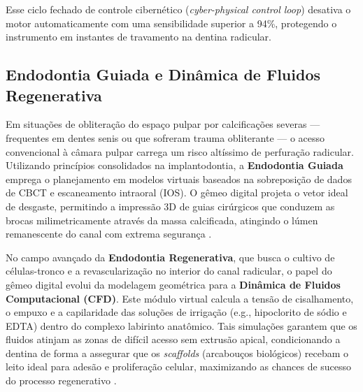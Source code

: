 Esse ciclo fechado de controle cibernético (\textit{cyber-physical control loop}) desativa o motor automaticamente com uma sensibilidade superior a 94\%, protegendo o instrumento em instantes de travamento na dentina radicular. 

\subsection{Endodontia Guiada e Dinâmica de Fluidos Regenerativa}

Em situações de obliteração do espaço pulpar por calcificações severas --- frequentes em dentes senis ou que sofreram trauma obliterante --- o acesso convencional à câmara pulpar carrega um risco altíssimo de perfuração radicular. Utilizando princípios consolidados na implantodontia, a \textbf{Endodontia Guiada} emprega o planejamento em modelos virtuais baseados na sobreposição de dados de CBCT e escaneamento intraoral (IOS). O gêmeo digital projeta o vetor ideal de desgaste, permitindo a impressão 3D de guias cirúrgicos que conduzem as brocas milimetricamente através da massa calcificada, atingindo o lúmen remanescente do canal com extrema segurança \cite{khoshfekr2025review}.


No campo avançado da \textbf{Endodontia Regenerativa}, que busca o cultivo de células-tronco e a revascularização no interior do canal radicular, o papel do gêmeo digital evolui da modelagem geométrica para a \textbf{Dinâmica de Fluidos Computacional (CFD)}. Este módulo virtual calcula a tensão de cisalhamento, o empuxo e a capilaridade das soluções de irrigação (e.g., hipoclorito de sódio e EDTA) dentro do complexo labirinto anatômico. Tais simulações garantem que os fluidos atinjam as zonas de difícil acesso sem extrusão apical, condicionando a dentina de forma a assegurar que os \textit{scaffolds} (arcabouços biológicos) recebam o leito ideal para adesão e proliferação celular, maximizando as chances de sucesso do processo regenerativo \cite{duggal2026exploring}.
